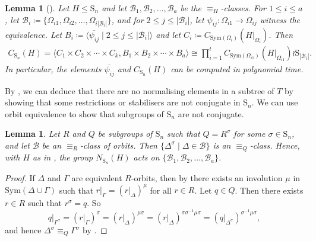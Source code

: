 \documentclass[11pt,a4paper]{article}
\newtheorem{lemma}[theorem]{Lemma}
\theoremstyle{definition}
\theoremstyle{remark}
\newcommand{\Sym}[0]{\mathrm{Sym}}
\newcommand{\Sy}{\mathrm{S}}
\begin{document}
\begin{lemma} [{\cite[\S6.1.2]{seress}}] \label{cent of subdir} 
Let $H\leq \Sy_n$ and let $\mathcal{B}_1,\mathcal{B}_2, \ldots, \mathcal{B}_a$ be the $\equiv_H$-classes. 
For $1 \leq i \leq a$, let $\mathcal{B}_i  \coloneqq  \{ \Omega_{i1}, \Omega_{i2}, \ldots, \Omega_{i|\mathcal{B}_i|} \}$, 
and for $2 \leq j \leq |\mathcal{B}_i|$, let $\psi_{ij}:\Omega_{i1} \rightarrow \Omega_{ij}$ witness the equivalence. 
Let $B_i  \coloneqq  \langle \overline{\psi_{ij}} \mid 2 \leq j \leq |\mathcal{B}_i| \rangle$ and let $C_i \coloneqq  C_{\Sym(\Omega_i)}(H|_{\Omega_i})$. 
Then 
\begin{eqnarray*}
C_{\Sy_n}(H) = \langle  C_1 \times C_2 \times \cdots \times C_k,  B_1 \times B_2 \times \cdots \times B_a  \rangle 
\cong \prod \limits_{i=1}^{t}  C_{\Sym(\Omega_{i1})}(H|_{\Omega_{i1}}) \wr \Sy_{|\mathcal{B}_i|}. 
\end{eqnarray*}
In particular, the elements $\overline{\psi_{ij}}$ and $C_{\Sy_n}(H)$ can be computed in polynomial time.
\end{lemma}


By , we can deduce that there are no normalising elements in a subtree of $T$ by showing that some restrictions or stabilisers are not conjugate in $\Sy_n$.
We can use orbit equivalence to show that subgroups of $\Sy_n$ are not conjugate.

\begin{lemma} \label{conjn maps equiv class to equiv class}
Let $R$ and $Q$ be subgroups of $\Sy_n$ such that $Q = R^\sigma$ for some $\sigma \in \Sy_n$, and let $\mathcal{B}$ be an $\equiv_R$-class of orbits. 
Then $\{ \Delta^\sigma \mid \Delta \in \mathcal{B} \}$ is an $\equiv_Q$-class. 
Hence, with $H$ as in , the group $N_{\Sy_{n}}(H)$ acts on $\{ \mathcal{B}_1, \mathcal{B}_2, \ldots, \mathcal{B}_a\}$.
\end{lemma}

\begin{proof}
If $\Delta$ and $\Gamma$ are equivalent $R$-orbits,  
then by  there exists an involution $\mu$ in $ \Sym(\Delta\cup\Gamma)$ such that $r|_{\Gamma} = (r|_{\Delta})^\mu$ for all $r \in R$. 
Let $q \in Q$. Then there exists $r \in R$ such that $r^\sigma = q$.
So
\[ 
q|_{\Gamma^\sigma}= (r|_{\Gamma})^\sigma = (r|_{\Delta})^{\mu\sigma} 
= (r|_{\Delta})^{\sigma\sigma^{-1}\mu\sigma} =  (q|_{\Delta^\sigma})^{\sigma^{-1}\mu\sigma}, 
\]
and hence $\Delta^\sigma \equiv_Q \Gamma^\sigma$ by .
\end{proof}
\end{document}
